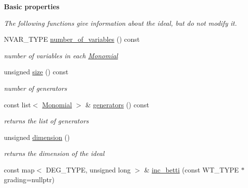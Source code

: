 \begin{Indent}\textbf{ Basic properties}\par
{\em The following functions give information about the ideal, but do not modify it. }\begin{DoxyCompactItemize}
\item 
\mbox{\label{group__polygroup_a606b7dd86fedd848182e6a4a6d18c77d}} 
N\+V\+A\+R\+\_\+\+T\+Y\+PE \hyperlink{group__polygroup_a606b7dd86fedd848182e6a4a6d18c77d}{number\+\_\+of\+\_\+variables} () const
\begin{DoxyCompactList}\small\item\em number of variables in each {\ttfamily \hyperlink{group__polygroup_class_monomial}{Monomial}} \end{DoxyCompactList}\item 
\mbox{\label{group__polygroup_a31f60f6a6370dc419d8083d3f3f469cc}} 
unsigned \hyperlink{group__polygroup_a31f60f6a6370dc419d8083d3f3f469cc}{size} () const
\begin{DoxyCompactList}\small\item\em number of generators \end{DoxyCompactList}\item 
\mbox{\label{group__polygroup_a2b7a092c8889479db32c76c0d2a65eae}} 
const list$<$ \hyperlink{group__polygroup_class_monomial}{Monomial} $>$ \& \hyperlink{group__polygroup_a2b7a092c8889479db32c76c0d2a65eae}{generators} () const
\begin{DoxyCompactList}\small\item\em returns the list of generators \end{DoxyCompactList}\item 
\mbox{\label{group__polygroup_a3be382128a7fc5e42b3a1cbcc226ceb9}} 
unsigned \hyperlink{group__polygroup_a3be382128a7fc5e42b3a1cbcc226ceb9}{dimension} ()
\begin{DoxyCompactList}\small\item\em returns the dimension of the ideal \end{DoxyCompactList}\item 
\mbox{\label{group__polygroup_a26ee2a655376a72284cd08ce64cbbfaa}} 
const map$<$ D\+E\+G\+\_\+\+T\+Y\+PE, unsigned long $>$ \& \hyperlink{group__polygroup_a26ee2a655376a72284cd08ce64cbbfaa}{inc\+\_\+betti} (const W\+T\+\_\+\+T\+Y\+PE $\ast$grading=nullptr)

\end{DoxyCompactItemize}
\end{Indent}
